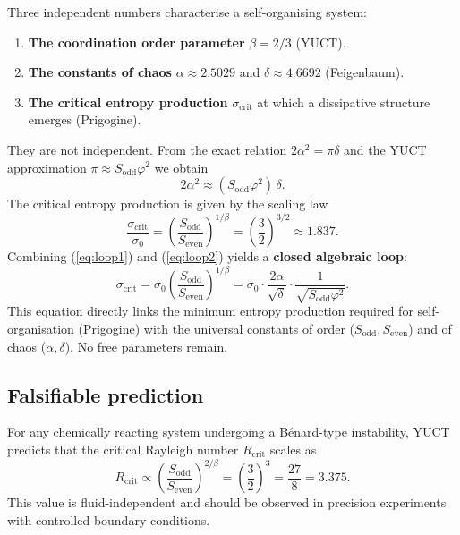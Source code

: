 \documentclass[11pt,a4paper]{article}
\begin{document}
	Three independent numbers characterise a self-organising system:
	\begin{enumerate}
		\item \textbf{The coordination order parameter} \(\beta = 2/3\) (YUCT).
		\item \textbf{The constants of chaos} \(\alpha \approx 2.5029\) and \(\delta \approx 4.6692\) (Feigenbaum).
		\item \textbf{The critical entropy production} \(\sigma_{\mathrm{crit}}\) at which a dissipative structure emerges (Prigogine).
	\end{enumerate}
	They are not independent. From the exact relation \(2\alpha^2 = \pi\delta\) and the YUCT approximation \(\pi \approx S_{\mathrm{odd}}\varphi^2\) we obtain
	\begin{equation}
		2\alpha^2 \approx (S_{\mathrm{odd}}\varphi^2)\,\delta .
		\label{eq:loop1}
	\end{equation}
	The critical entropy production is given by the scaling law
	\begin{equation}
		\frac{\sigma_{\mathrm{crit}}}{\sigma_0} = \left( \frac{S_{\mathrm{odd}}}{S_{\mathrm{even}}} \right)^{1/\beta}
		= \left( \frac{3}{2} \right)^{3/2} \approx 1.837 .
		\label{eq:loop2}
	\end{equation}
	Combining (\ref{eq:loop1}) and (\ref{eq:loop2}) yields a \textbf{closed algebraic loop}:
	\[
	\boxed{
		\sigma_{\mathrm{crit}} = \sigma_0 \left( \frac{S_{\mathrm{odd}}}{S_{\mathrm{even}}} \right)^{1/\beta}
		= \sigma_0 \cdot \frac{2\alpha}{\sqrt{\delta}} \cdot \frac{1}{\sqrt{S_{\mathrm{odd}}\varphi^2}} .
	}
	\]
	This equation directly links the minimum entropy production required for self-organisation (Prigogine) with the universal constants of order (\(S_{\mathrm{odd}},S_{\mathrm{even}}\)) and of chaos (\(\alpha,\delta\)). No free parameters remain.
	
	\subsection{Falsifiable prediction}
	
	For any chemically reacting system undergoing a Bénard-type instability, YUCT predicts that the critical Rayleigh number \(R_{\mathrm{crit}}\) scales as
	\[
	R_{\mathrm{crit}} \propto \left( \frac{S_{\mathrm{odd}}}{S_{\mathrm{even}}} \right)^{2/\beta}
	= \left( \frac{3}{2} \right)^3 = \frac{27}{8} = 3.375 .
	\]
	This value is fluid-independent and should be observed in precision experiments with controlled boundary conditions.
	
\end{document}
